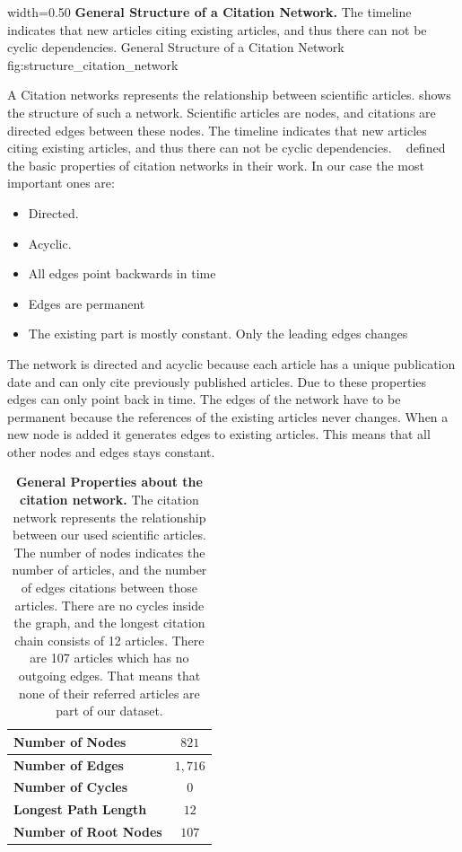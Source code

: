       {width=0.50\textwidth}
      {\textbf{General Structure of a Citation Network.} The timeline indicates that new articles citing existing articles, and thus there can not be cyclic dependencies.}
      {General Structure of a Citation Network}
      {fig:structure_citation_network}

A Citation networks represents the relationship between scientific articles.  shows the structure of such a network. Scientific articles are nodes, and citations are directed edges between these nodes. The timeline indicates that new articles citing existing articles, and thus there can not be cyclic dependencies. ~\cite{kas2011} defined the basic properties of citation networks in their work. In our case the most important ones are:

\begin{itemize}
  \item Directed.
  \item Acyclic.
  \item All edges point backwards in time
  \item Edges are permanent
  \item The existing part is mostly constant. Only the leading edges changes
\end{itemize}

The network is directed and acyclic because each article has a unique publication date and can only cite previously published articles. Due to these properties edges can only point back in time. The edges of the network have to be permanent because the references of the existing articles never changes. When a new node is added it generates edges to existing articles. This means that all other nodes and edges stays constant.

\begin{table}[!b]
  \centering
  \begin{tabular}{ l c }
    \toprule
    \textbf{Number of Nodes}      & $821$  \\ \midrule
    \textbf{Number of Edges}      & $1,716$ \\ \midrule
    \textbf{Number of Cycles}     & $0$    \\ \midrule
    \textbf{Longest Path Length}  & $12$   \\ \midrule
    \textbf{Number of Root Nodes} & $107$  \\
    \bottomrule
  \end{tabular}
  \caption[General Properties about the citation network]{\textbf{General Properties about the citation network.} The citation network represents the relationship between our used scientific articles. The number of nodes indicates the number of articles, and the number of edges citations between those articles. There are no cycles inside the graph, and the longest citation chain consists of 12 articles. There are 107 articles which has no outgoing edges. That means that none of their referred articles are part of our dataset.}
  \label{tbl:general_properties_about_the_graph}
\end{table}

